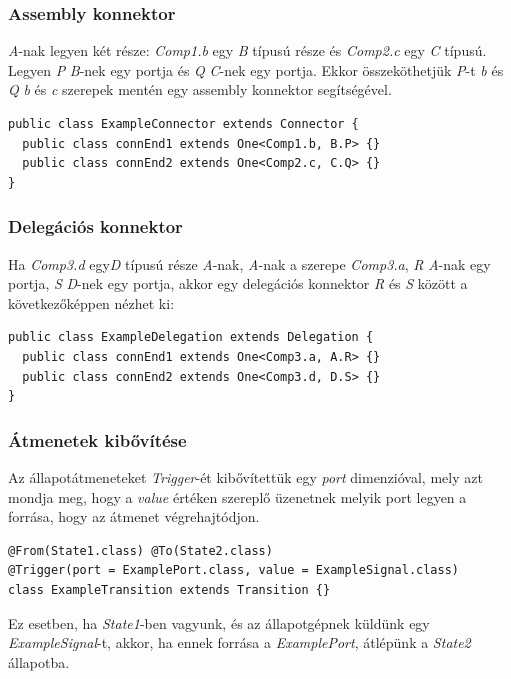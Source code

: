 \documentclass[a4paper,12pt]{report}
\begin{document}
\subsubsection{Assembly konnektor}

\textit{A}-nak legyen két része: \textit{Comp1.b} egy \textit{B} típusú része és \textit{Comp2.c} egy \textit{C} típusú. Legyen \textit{P} \textit{B}-nek egy portja és \textit{Q} \textit{C}-nek egy portja. Ekkor összeköthetjük \textit{P}-t \textit{b} és \textit{Q} \textit{b} és \textit{c} szerepek mentén egy assembly konnektor segítségével. 

\begin{lstlisting}
public class ExampleConnector extends Connector {
  public class connEnd1 extends One<Comp1.b, B.P> {}
  public class connEnd2 extends One<Comp2.c, C.Q> {}
}
\end{lstlisting}

\subsubsection{Delegációs konnektor}
Ha \textit{Comp3.d} egy\textit{D} típusú része \textit{A}-nak, \textit{A}-nak a szerepe \textit{Comp3.a}, \textit{R} \textit{A}-nak egy portja, \textit{S} \textit{D}-nek egy portja, akkor egy delegációs konnektor \textit{R} és \textit{S} között a következőképpen nézhet ki:
\begin{lstlisting}
public class ExampleDelegation extends Delegation {
  public class connEnd1 extends One<Comp3.a, A.R> {}
  public class connEnd2 extends One<Comp3.d, D.S> {}
}
\end{lstlisting}

\subsubsection{Átmenetek kibővítése}
Az állapotátmeneteket \textit{Trigger}-ét kibővítettük egy \textit{port} dimenzióval, mely azt mondja meg, hogy a \textit{value} értéken szereplő üzenetnek melyik port legyen a forrása, hogy az átmenet végrehajtódjon.
\begin{lstlisting}
@From(State1.class) @To(State2.class)
@Trigger(port = ExamplePort.class, value = ExampleSignal.class)
class ExampleTransition extends Transition {}
\end{lstlisting}

Ez esetben, ha \textit{State1}-ben vagyunk, és az állapotgépnek küldünk egy  \textit{ExampleSignal}-t, akkor, ha ennek forrása a \textit{ExamplePort}, átlépünk a \textit{State2} állapotba.
\end{document}
